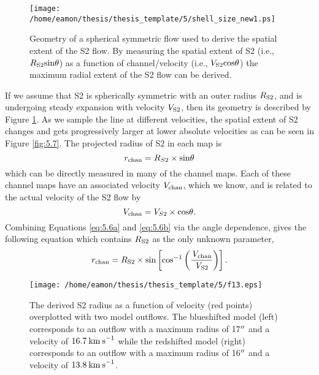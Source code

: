 \begin{figure}[!ht]
\centering 
\texttt{[image: /home/eamon/thesis/thesis\_template/5/shell\_size\_new1.ps]}
\caption[Geometry of a spherical symmetric flow]{Geometry of a spherical symmetric flow used to derive the spatial extent of the S2 flow. By measuring the spatial extent of S2 (i.e., $R_{\rm{S2}}\rm{sin}\theta$) as a function of channel/velocity (i.e., $V_{\rm{S2}}\rm{cos}\theta$) the maximum radial extent of the S2 flow can be derived.}
\label{fig:5.8}
\end{figure}

If we assume that S2 is spherically symmetric with an outer radius $R_{\rm{S2}}$, and is undergoing steady expansion with velocity $V_{\rm{S2}}$, then its geometry is described by Figure \ref{fig:5.8}. As we sample the line at different velocities, the spatial extent of S2 changes and gets progressively larger at lower absolute velocities as can be seen in Figure \ref{fig:5.7}. The projected radius of S2 in each map is
\begin{equation}
r_{\rm{chan}}=R_{S2}\times \rm{sin}\mathrm{\theta}
\label{eq:5.6a}
\end{equation}
which can be directly measured in many of the channel maps. Each of these channel maps have an associated velocity $V_{\rm{chan}}$, which we know, and is related to the actual velocity of the S2 flow by
\begin{equation}
V_{\rm{chan}}=V_{S2}\times \rm{cos}\mathrm{\theta}.
\label{eq:5.6b}
\end{equation}
Combining Equations \ref{eq:5.6a} and \ref{eq:5.6b} via the angle dependence, gives the following equation which contains $R_{\rm{S2}}$ as the only unknown parameter,
\begin{equation}
r_{\rm{chan}}= R_{\rm{S2}}\times \rm{sin}\left[\rm{cos}^{-1}\left(\frac{\mathit{V}_{chan}}{\mathit{V}_{S2}}\right) \right].
\label{eq:5.6c}
\end{equation} 

\begin{figure}[!ht]
\centering 
\texttt{[image: /home/eamon/thesis/thesis\_template/5/f13.eps]}
\caption[S2 radius as a function of channel velocity]{The derived S2 radius as a function of velocity (red points) overplotted with two model outflows. The blueshifted model (left) corresponds to an outflow with a maximum radius of 17$^{\prime\prime}$ and a velocity of $16.7\>{\rm km\>s}^{-1}$ while the redshifted model (right) corresponds to an outflow with a maximum radius of 16$^{\prime\prime}$ and a velocity of $13.8\>{\rm km\>s}^{-1}$.}
\label{fig:5.10}
\end{figure}

